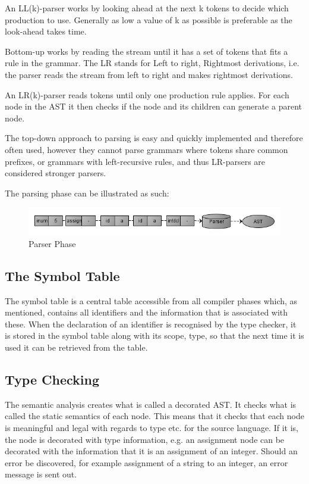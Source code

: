 An LL(k)-parser works by looking ahead at the next k tokens to decide which production to use. Generally as low a value of k as possible is preferable as the look-ahead takes time. 

Bottom-up works by reading the stream until it has a set of tokens that fits a rule in the grammar. The LR stands for Left to right, Rightmost derivations, i.e. the parser reads the stream from left to right and makes rightmost derivations.

An LR(k)-parser reads tokens until only one production rule applies. For each node in the AST it then checks if the node and its children can generate a parent node.

The top-down approach to parsing is easy and quickly implemented and therefore often used, however they cannot parse grammars where tokens share common prefixes, or grammars with left-recursive rules, and thus LR-parsers are considered stronger parsers.

The parsing phase can be illustrated as such:

\begin{figure}[ht]
	\centering
		\includegraphics[scale = 0.5]{img/parser.png}
	\caption{Parser Phase}
	\label{fig:parser}
\end{figure}

\subsection{The Symbol Table}

The symbol table is a central table accessible from all compiler phases which, as mentioned, contains all identifiers and the information that is associated with these. When the declaration of an identifier is recognised by the type checker, it is stored in the symbol table along with its scope, type, so that the next time it is used it can be retrieved from the table.

\subsection{Type Checking}
The semantic analysis creates what is called a decorated AST. It checks what is called the static semantics of each node. This means that it checks that each node is meaningful and legal with regards to type etc. for the source language. If it is, the node is decorated with type information, e.g. an assignment node can be decorated with the information that it is an assignment of an integer. Should an error be discovered, for example assignment of a string to an integer, an error message is sent out. 

